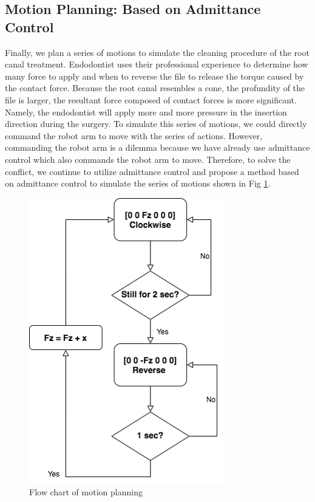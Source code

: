 \subsection{Motion Planning: Based on Admittance Control}
\label{sec:motion planning} 
Finally, we plan a series of motions to simulate the cleaning procedure of the root canal treatment. Endodontist uses their professional experience to determine how many force to apply and when to reverse the file to release the torque caused by the contact force. Because the root canal resembles a cone, the profundity of the file is larger, the resultant force composed of contact forces is more significant. Namely, the endodontist will apply more and more pressure in the insertion direction during the surgery. To simulate this series of motions, we could directly command the robot arm to move with the series of actions. However, commanding the robot arm is a dilemma because we have already use admittance control which also commands the robot arm to move. Therefore,  to solve the conflict, we continue to utilize admittance control and propose a method based on admittance control to simulate the series of motions shown in Fig \ref{fig:motion planning_flow chart}.
\begin{figure}[htbp]
\begin{center}
\includegraphics[width=0.5\linewidth]{Images/motion planning_flow chart.png}
\hspace*{6mm}\caption{
Flow chart of motion planning
}\label{fig:motion planning_flow chart}
\end{center}
\end{figure}

